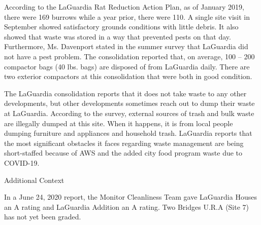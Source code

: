 According to the LaGuardia Rat Reduction Action Plan, as of January 2019, there were 169 burrows while a year prior, there were 110. A single site visit in September showed satisfactory grounds conditions with little debris. It also showed that waste was stored in a way that prevented pests on that day. Furthermore, Ms. Davenport stated in the summer survey that LaGuardia did not have a pest problem. The consolidation reported that, on average, 100 -- 200 compactor bags (40 lbs. bags) are disposed of from LaGuardia daily. There are two exterior compactors at this consolidation that were both in good condition. 

The LaGuardia consolidation reports that it does not take waste to any other developments, but other developments sometimes reach out to dump their waste at LaGuardia. According to the survey, external sources of trash and bulk waste are illegally dumped at this site. When it happens, it is from local people dumping furniture and appliances and household trash. LaGuardia reports that the most significant obstacles it faces regarding waste management are being short-staffed because of AWS and the added city food program waste due to COVID-19.

Additional Context 

In a June 24, 2020 report, the Monitor Cleanliness Team gave LaGuardia Houses an A rating and LaGuardia Addition an A rating. Two Bridges U.R.A (Site 7) has not yet been graded.